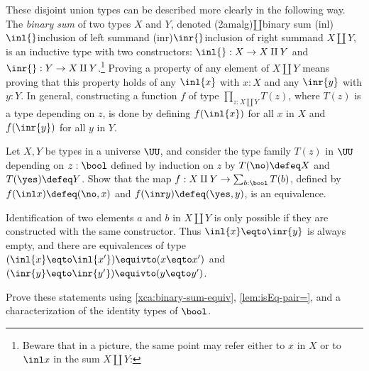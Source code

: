 These disjoint union types can be described more clearly in the following way.
The \emph{binary sum} of two types $X$ and $Y$, denoted
%
\glossary(2amalg){$\amalg$}{binary sum}%
\glossary(inl){$\protect\inl{}$}{inclusion of left summand}%
\glossary(inr){$\protect\inr{}$}{inclusion of right summand}%
$X \amalg Y$,
is an inductive type with two constructors: $\inl{} : X \to X \amalg Y$ and
$\inr{} : Y \to X \amalg Y$.\footnote{%
  Beware that in a picture, the same point may refer
  either to $x$ in $X$ or to $\inl x$ in the sum $X \amalg Y$:\par
  }
Proving a property of any element of $X \amalg Y$
means proving that this property holds of any $\inl{x}$ with $x:X$ and any
$\inr{y}$ with $y:Y$. In general, constructing a function $f$ of type
$\prod_{z: X \amalg Y} T(z)$, where $T(z)$ is a type depending on
$z$, is done by defining $f(\inl{x})$ for all $x$ in $X$
and $f(\inr{y})$ for all $y$ in $Y$.

\begin{xca}\label{xca:binary-sum-equiv}
  Let $X,Y$ be types in a universe $\UU$, and consider the type family
  $T(z)$ in $\UU$ depending on $z:\bool$ defined by induction on $z$ by
  $T(\no)\defeq X$ and $T(\yes) \defeq Y$.
  Show that the map $f : X\amalg Y \to \sum_{b:\bool}T(b)$,
  defined by $f (\inl x) \defeq (\no,x)$ and $f(\inr y) \defeq (\yes,y)$,
  is an equivalence.
\end{xca}

Identification of two elements $a$ and $b$ in $X \amalg Y$ is
only possible if they are constructed with the same constructor.
Thus $\inl{x} \eqto \inr{y}$ is always empty, and there are equivalences of type
$(\inl{x} \eqto \inl{x'}) \equivto (x \eqto x')$ and
$(\inr{y} \eqto \inr{y'}) \equivto (y \eqto y')$.

\begin{xca}\label{xca:binary-sum-id}
  Prove these statements using \cref{xca:binary-sum-equiv},
  \cref{lem:isEq-pair=}, and a characterization
  of the identity types of $\bool$.
\end{xca}

